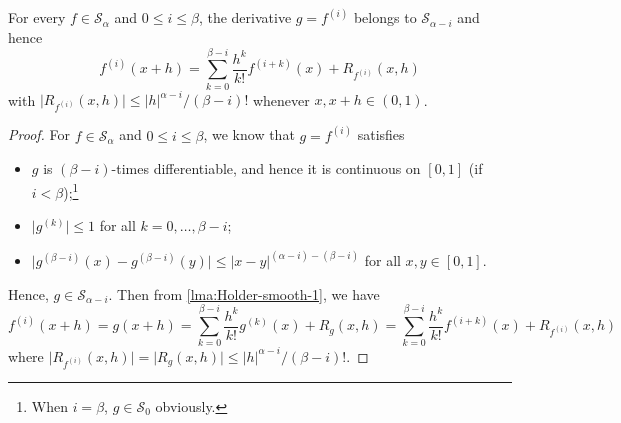 \begin{lemma}\label{lma:Holder-smooth-2}
	For every \(f\in \mathcal{S} _\alpha \) and \(0 \leq i \leq \beta \), the derivative \(g = f^{(i)}\) belongs to \(\mathcal{S} _{\alpha - i}\) and hence
	\[
		f^{(i)} (x + h) = \sum_{k=0}^{\beta - i} \frac{h^k}{k!}f^{(i+k)}(x) + R_{f^{(i)}}(x, h)
	\]
	with \(\vert R_{f^{(i)}} (x, h) \vert \leq \vert h \vert ^{\alpha - i} / (\beta - i)!\) whenever \(x, x+h\in (0, 1)\).
\end{lemma}
\begin{proof}
	For \(f\in \mathcal{S} _\alpha \) and \(0 \leq i \leq \beta \), we know that \(g = f^{(i)}\) satisfies
	\begin{itemize}
		\item \(g\) is \((\beta - i)\)-times differentiable, and hence it is continuous on \([0, 1]\) (if \(i < \beta \));\footnote{When \(i = \beta \), \(g\in \mathcal{S} _0\) obviously.}
		\item \(\vert g^{(k)} \vert \leq 1\) for all \(k = 0, \dots , \beta - i\);
		\item \(\vert g^{(\beta - i)} (x) - g^{(\beta - i)}(y)\vert \leq \vert x - y \vert ^{(\alpha - i) - (\beta - i)}\) for all \(x, y\in [0, 1]\).
	\end{itemize}
	Hence, \(g \in \mathcal{S} _{\alpha - i}\). Then from \autoref{lma:Holder-smooth-1}, we have
	\[
		f^{(i)}(x+h) = g(x+h)
		= \sum_{k=0}^{\beta - i}\frac{h^k}{k!} g^{(k)}(x) + R_g(x, h)
		= \sum_{k=0}^{\beta - i} \frac{h^k}{k!} f^{(i+k)}(x) + R_{f^{(i)}}(x, h)
	\]
	where \(\vert R_{f^{(i)}} (x, h)\vert = \vert R_g(x, h) \vert \leq \vert h \vert ^{\alpha - i} / (\beta - i)!\).
\end{proof}

